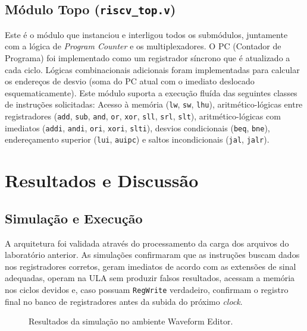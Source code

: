 \documentclass[conference]{IEEEtran}
\begin{document}
\subsection{Módulo Topo (\texttt{riscv\_top.v})}
Este é o módulo que instanciou e interligou todos os submódulos, juntamente com a lógica de \textit{Program Counter} e os multiplexadores. O PC (Contador de Programa) foi implementado como um registrador síncrono que é atualizado a cada ciclo. Lógicas combinacionais adicionais foram implementadas para calcular os endereços de desvio (soma do PC atual com o imediato deslocado esquematicamente). Este módulo suporta a execução fluída das seguintes classes de instruções solicitadas: Acesso à memória (\texttt{lw}, \texttt{sw}, \texttt{lhu}), aritmético-lógicas entre registradores (\texttt{add}, \texttt{sub}, \texttt{and}, \texttt{or}, \texttt{xor}, \texttt{sll}, \texttt{srl}, \texttt{slt}), aritmético-lógicas com imediatos (\texttt{addi}, \texttt{andi}, \texttt{ori}, \texttt{xori}, \texttt{slti}), desvios condicionais (\texttt{beq}, \texttt{bne}), endereçamento superior (\texttt{lui}, \texttt{auipc}) e saltos incondicionais (\texttt{jal}, \texttt{jalr}).

\section{Resultados e Discussão}

\subsection{Simulação e Execução}
A arquitetura foi validada através do processamento da carga dos arquivos do laboratório anterior. As simulações confirmaram que as instruções buscam dados nos registradores corretos, geram imediatos de acordo com as extensões de sinal adequadas, operam na ULA sem produzir falsos resultados, acessam a memória nos ciclos devidos e, caso possuam \texttt{RegWrite} verdadeiro, confirmam o registro final no banco de registradores antes da subida do próximo \textit{clock}.

\begin{figure}[!ht]
    \centering
    \vspace{4cm} %
    \caption{Resultados da simulação no ambiente Waveform Editor.}
    \label{fig:waveform}
\end{figure}
\end{document}
